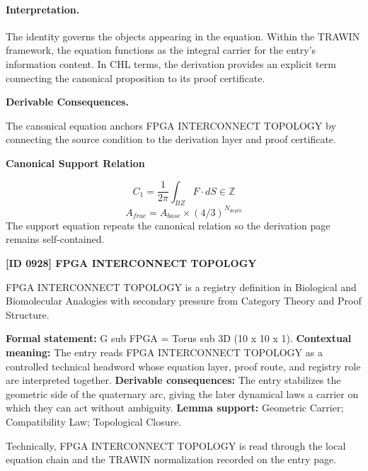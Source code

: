 \paragraph{Interpretation.}
The identity governs the objects appearing in the equation. Within the TRAWIN framework, the equation functions as the integral carrier for the entry’s information content. In CHL terms, the derivation provides an explicit term connecting the canonical proposition to its proof certificate.

\par\vspace{0.35em}
\noindent\textbf{Derivable Consequences.}\quad
\begingroup
\footnotesize
\raggedright
The canonical equation anchors FPGA INTERCONNECT TOPOLOGY by connecting the source condition to the derivation layer and proof certificate.
\par\endgroup

\noindent\textbf{Canonical Support Relation}\par
\[
C_1 = \frac{1}{2\pi} \int_{BZ} F \cdot dS \in \mathbb{Z}
\]
\[
A_{frac} = A_{base} \times (4/3)^{N_{depth}}
\]
\noindent The support equation repeats the canonical relation so the derivation page remains self-contained.\par

\clearpage
\noindent\textbf{[ID 0928] FPGA INTERCONNECT TOPOLOGY}\par
\vspace{0.35em}
\begingroup\small
{}
FPGA INTERCONNECT TOPOLOGY is a registry definition in Biological and Biomolecular Analogies with secondary pressure from Category Theory and Proof Structure.

\begingroup\footnotesize\setlength{\emergencystretch}{3em}\sloppy
\textbf{Formal statement:} G sub FPGA = Torus sub 3D (10 x 10 x 1). \textbf{Contextual meaning:} The entry reads FPGA INTERCONNECT TOPOLOGY as a controlled technical headword whose equation layer, proof route, and registry role are interpreted together. \textbf{Derivable consequences:} The entry stabilizes the geometric side of the quaternary arc, giving the later dynamical laws a carrier on which they can act without ambiguity. \textbf{Lemma support:} Geometric Carrier; Compatibility Law; Topological Closure.\par
\endgroup

Technically, FPGA INTERCONNECT TOPOLOGY is read through the local equation chain and the TRAWIN normalization recorded on the entry page.

